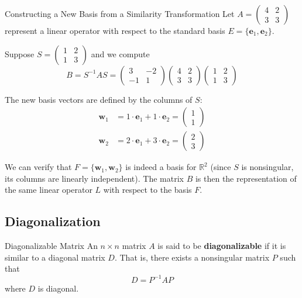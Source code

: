 \documentclass[12pt,a4paper]{article}
\newcommand{\R}{\mathbb{R}}
\newcommand{\vv}[1]{\mathbf{#1}}
\begin{document}
	\begin{example}{Constructing a New Basis from a Similarity Transformation}
		Let $A = \begin{pmatrix} 4 & 2 \\ 3 & 3 \end{pmatrix}$ represent a linear operator with respect to the standard basis $E = \{\vv{e}_1, \vv{e}_2\}$.
		
		Suppose $S = \begin{pmatrix} 1 & 2 \\ 1 & 3 \end{pmatrix}$ and we compute
		\[
		B = S^{-1}AS = \begin{pmatrix} 3 & -2 \\ -1 & 1 \end{pmatrix} \begin{pmatrix} 4 & 2 \\ 3 & 3 \end{pmatrix} \begin{pmatrix} 1 & 2 \\ 1 & 3 \end{pmatrix}
		\]
		
		The new basis vectors are defined by the columns of $S$:
		\begin{align*}
			\vv{w}_1 &= 1 \cdot \vv{e}_1 + 1 \cdot \vv{e}_2 = \begin{pmatrix} 1 \\ 1 \end{pmatrix} \\
			\vv{w}_2 &= 2 \cdot \vv{e}_1 + 3 \cdot \vv{e}_2 = \begin{pmatrix} 2 \\ 3 \end{pmatrix}
		\end{align*}
		
		We can verify that $F = \{\vv{w}_1, \vv{w}_2\}$ is indeed a basis for $\R^2$ (since $S$ is nonsingular, its columns are linearly independent). The matrix $B$ is then the representation of the same linear operator $L$ with respect to the basis $F$.
	\end{example}
	
	\subsection{Diagonalization}
	
	\begin{definition}{Diagonalizable Matrix}
		An $n \times n$ matrix $A$ is said to be \textbf{diagonalizable} if it is similar to a diagonal matrix $D$. That is, there exists a nonsingular matrix $P$ such that
		\[
		D = P^{-1}AP
		\]
		where $D$ is diagonal.
	\end{definition}
	
\end{document}

